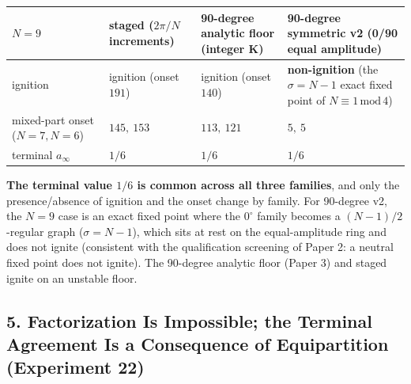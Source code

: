 \documentclass[
  a4paper,
]{ltjsarticle}
\newcounter{none} %
\begin{document}
{\def\LTcaptype{none} %
\begin{longtable}[]{@{}
  >{\raggedright\arraybackslash}p{}
  >{\raggedright\arraybackslash}p{}
  >{\raggedright\arraybackslash}p{}
  >{\raggedright\arraybackslash}p{}@{}}
\toprule\noalign{}
\begin{minipage}[b]{\linewidth}\raggedright
\(N=9\)
\end{minipage} & \begin{minipage}[b]{\linewidth}\raggedright
staged (\(2\pi/N\) increments)
\end{minipage} & \begin{minipage}[b]{\linewidth}\raggedright
90-degree analytic floor (integer K)
\end{minipage} & \begin{minipage}[b]{\linewidth}\raggedright
90-degree symmetric v2 (0/90 equal amplitude)
\end{minipage} \\
\midrule\noalign{}
\endhead
\bottomrule\noalign{}
\endlastfoot
ignition & ignition (onset \(191\)) & ignition (onset \(140\)) &
\textbf{non-ignition} (the \(\sigma=N-1\) exact fixed point of
\(N\equiv1\,\mathrm{mod}\,4\)) \\
mixed-part onset (\(N=7,N=6\)) & \(145,\ 153\) & \(113,\ 121\) &
\(5,\ 5\) \\
terminal \(a_\infty\) & \(1/6\) & \(1/6\) & \(1/6\) \\
\end{longtable}
}

\textbf{The terminal value \(1/6\) is common across all three families},
and only the presence/absence of ignition and the onset change by
family. For 90-degree v2, the \(N=9\) case is an exact fixed point where
the \(0^\circ\) family becomes a \((N-1)/2\)-regular graph
(\(\sigma=N-1\)), which sits at rest on the equal-amplitude ring and
does not ignite (consistent with the qualification screening of Paper 2:
a neutral fixed point does not ignite). The 90-degree analytic floor
(Paper 3) and staged ignite on an unstable floor.

\subsection{5. Factorization Is Impossible; the Terminal Agreement Is a
Consequence of Equipartition (Experiment
22)}\label{factorization-is-impossible-the-terminal-agreement-is-a-consequence-of-equipartition-experiment-22}
\end{document}

